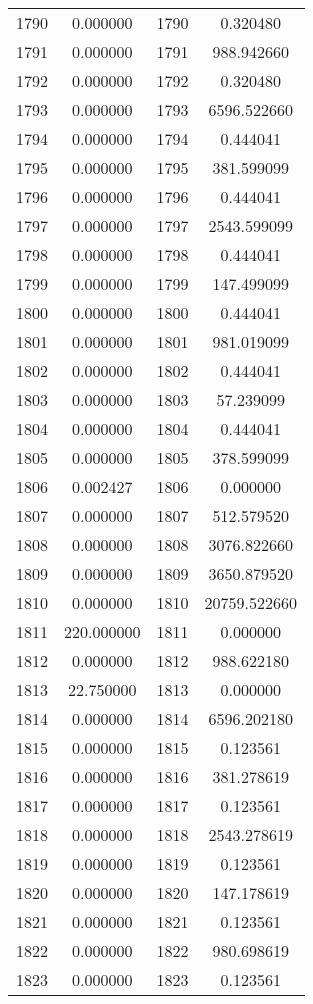 \documentclass[12pt]{article}
\begin{document}
\begin{longtable}{@{}cccc@{}}
1790 & 0.000000 & 1790 & 0.320480 \\
1791 & 0.000000 & 1791 & 988.942660 \\
1792 & 0.000000 & 1792 & 0.320480 \\
1793 & 0.000000 & 1793 & 6596.522660 \\
1794 & 0.000000 & 1794 & 0.444041 \\
1795 & 0.000000 & 1795 & 381.599099 \\
1796 & 0.000000 & 1796 & 0.444041 \\
1797 & 0.000000 & 1797 & 2543.599099 \\
1798 & 0.000000 & 1798 & 0.444041 \\
1799 & 0.000000 & 1799 & 147.499099 \\
1800 & 0.000000 & 1800 & 0.444041 \\
1801 & 0.000000 & 1801 & 981.019099 \\
1802 & 0.000000 & 1802 & 0.444041 \\
1803 & 0.000000 & 1803 & 57.239099 \\
1804 & 0.000000 & 1804 & 0.444041 \\
1805 & 0.000000 & 1805 & 378.599099 \\
1806 & 0.002427 & 1806 & 0.000000 \\
1807 & 0.000000 & 1807 & 512.579520 \\
1808 & 0.000000 & 1808 & 3076.822660 \\
1809 & 0.000000 & 1809 & 3650.879520 \\
1810 & 0.000000 & 1810 & 20759.522660 \\
1811 & 220.000000 & 1811 & 0.000000 \\
1812 & 0.000000 & 1812 & 988.622180 \\
1813 & 22.750000 & 1813 & 0.000000 \\
1814 & 0.000000 & 1814 & 6596.202180 \\
1815 & 0.000000 & 1815 & 0.123561 \\
1816 & 0.000000 & 1816 & 381.278619 \\
1817 & 0.000000 & 1817 & 0.123561 \\
1818 & 0.000000 & 1818 & 2543.278619 \\
1819 & 0.000000 & 1819 & 0.123561 \\
1820 & 0.000000 & 1820 & 147.178619 \\
1821 & 0.000000 & 1821 & 0.123561 \\
1822 & 0.000000 & 1822 & 980.698619 \\
1823 & 0.000000 & 1823 & 0.123561 \\

\end{longtable}
\end{document}

